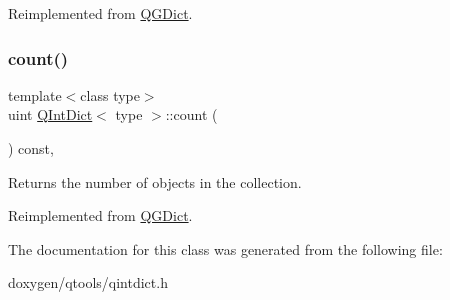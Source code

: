 Reimplemented from \mbox{\hyperlink{class_q_g_dict_a991443b3568622b97772e234fe61dfd7}{Q\+G\+Dict}}.

\mbox{\label{class_q_int_dict_acba9c2286ecaab46e0231e145ef5e471}} 
\subsubsection{\texorpdfstring{count()}{count()}}
{\footnotesize\ttfamily template$<$class type$>$ \\
uint \mbox{\hyperlink{class_q_int_dict}{Q\+Int\+Dict}}$<$ type $>$\+::count (\begin{DoxyParamCaption}{ }\end{DoxyParamCaption}) const\hspace{0.3cm}{\ttfamily [inline]}, {\ttfamily [virtual]}}

Returns the number of objects in the collection. 

Reimplemented from \mbox{\hyperlink{class_q_g_dict_a13f6cc9bdbfe37db323b47947c1e017c}{Q\+G\+Dict}}.



The documentation for this class was generated from the following file\+:\begin{DoxyCompactItemize}
\item 
doxygen/qtools/qintdict.\+h\end{DoxyCompactItemize}
